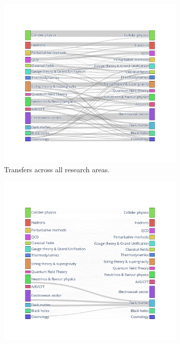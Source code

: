 \documentclass{article}
\begin{document}
 \begin{figure}[h]
     \centering
\begin{subfigure}[t]{.47\textwidth}
\includegraphics[width=1.05\textwidth,trim={2.1cm 1.5cm 2.1cm 1.5cm},clip]{Fig4a.pdf}
    \caption{\label{fig:sankey_a}Transfers across all research areas.}
\end{subfigure}\hfill%
\begin{subfigure}[t]{0.47\textwidth}
\includegraphics[width=1.05\textwidth,trim={2.1cm 1.5cm 2.1cm 1.5cm},clip]{Fig4b.pdf}

\end{subfigure}
\end{figure}
\end{document}
